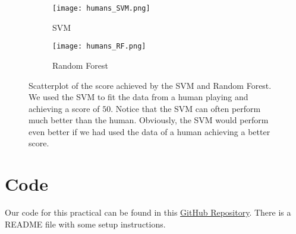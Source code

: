 \documentclass[10pt]{article}
\begin{document}
\medskip

\begin{figure}[H]
\centering
\begin{subfigure}{.5\textwidth}
  \centering
  \label{SVM}
  \texttt{[image: humans\_SVM.png]}
  \caption{SVM}
\end{subfigure}%
\begin{subfigure}{.5\textwidth}
  \centering
  \texttt{[image: humans\_RF.png]}
  \caption{Random Forest}
  \label{Random Forest}
\end{subfigure}
\caption{Scatterplot of the score achieved by the SVM and Random Forest. We used the SVM to fit the
data from a human playing and achieving a score of $50$. Notice that the SVM
can often perform much better than the human. Obviously, the SVM would perform
even better if we had used the data of a human achieving a better score.}
\end{figure}

\section{Code}

Our code for this practical can be found in this
\href{https://github.com/victordomene/cs181-practicals/tree/master/practical4}{GitHub
Repository}. There is a README file with some setup instructions.
\end{document}
